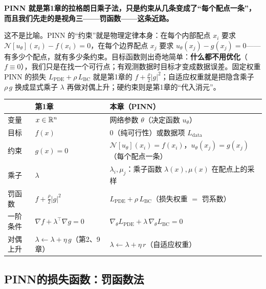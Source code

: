 \begin{tcolorbox}[colback=yellow!10, colframe=orange!80, title=本章的核心观点]
\textbf{PINN 就是第1章的拉格朗日乘子法，只是约束从几条变成了“每个配点一条”，而且我们先走的是视角三——罚函数——这条近路。}

这不是比喻。PINN 的“约束”就是物理定律本身：在每个内部配点 $x_i$ 要求 $\mathcal{N}[u_\theta](x_i) - f(x_i) = 0$，在每个边界配点 $x_j$ 要求 $u_\theta(x_j) - g(x_j) = 0$——有多少个配点，就有多少条约束。目标函数则出奇地简单：\textbf{什么都不用优化}（$f \equiv 0$），我们只是在找一个可行点；有观测数据时目标才变成数据误差。固定权重 PINN 的损失 $L_{\mathrm{PDE}} + \rho\, L_{\mathrm{BC}}$ 就是第1章的 $f + \frac{\rho}{2}|g|^2$；自适应权重就是把隐含乘子 $\rho\, g$ 换成显式乘子 $\lambda$ 再做对偶上升；硬约束则是第1章的“代入消元”。

\begin{center}
\renewcommand{\arraystretch}{1.3}
\small
\begin{tabularx}{\linewidth}{l>{\raggedright\arraybackslash}p{3.6cm}>{\raggedright\arraybackslash}X}
\toprule
 & \textbf{第1章} & \textbf{本章（PINN）} \\
\midrule
变量 & $x \in \mathbb{R}^n$ & 网络参数 $\theta$（决定函数 $u_\theta$） \\
目标 & $f(x)$ & $0$（纯可行性）或数据项 $L_{\mathrm{data}}$ \\
约束 & $g(x) = 0$ & $\mathcal{N}[u_\theta](x_i) = f(x_i)$，$u_\theta(x_j) = g(x_j)$（每个配点一条） \\
乘子 & $\lambda$ & $\lambda_i, \mu_j$：乘子函数 $\lambda(x), \mu(x)$ 在配点上的采样 \\
罚函数 & $f + \frac{\rho}{2}|g|^2$ & $L_{\mathrm{PDE}} + \rho\, L_{\mathrm{BC}}$（损失权重 $=$ 罚系数） \\
一阶条件 & $\nabla f + \lambda^\top \nabla g = 0$ & $\nabla_\theta L_{\mathrm{PDE}} + \lambda\, \nabla_\theta L_{\mathrm{BC}} = 0$ \\
对偶上升 & $\lambda \leftarrow \lambda + \eta\, g$（第2、9章） & $\lambda \leftarrow \lambda + \eta\, r$（自适应权重） \\
\bottomrule
\end{tabularx}
\end{center}
\end{tcolorbox}

\subsection{PINN的损失函数：罚函数法}

